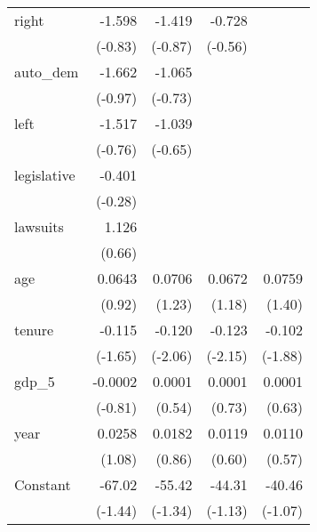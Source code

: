 \begin{table}[h]
{\begin{threeparttable}
\begin{tabular}{l*{4}{D{.}{.}{-1}}}
			\addlinespace
			right               &      -1.598         &      -1.419         &      -0.728         &                     \\
			&     (-0.83)         &     (-0.87)         &     (-0.56)         &                     \\
			\addlinespace
			auto\_dem            &      -1.662         &      -1.065         &                     &                     \\
			&     (-0.97)         &     (-0.73)         &                     &                     \\
			\addlinespace
			left                &      -1.517         &      -1.039         &                     &                     \\
			&     (-0.76)         &     (-0.65)         &                     &                     \\
			\addlinespace
			legislative         &      -0.401         &                     &                     &                     \\
			&     (-0.28)         &                     &                     &                     \\
			\addlinespace
			lawsuits            &       1.126         &                     &                     &                     \\
			&      (0.66)         &                     &                     &                     \\
			\addlinespace
			age                 &      0.0643         &      0.0706         &      0.0672         &      0.0759         \\
			&      (0.92)         &      (1.23)         &      (1.18)         &      (1.40)         \\
			\addlinespace
			tenure              &      -0.115         &      -0.120\sym{**} &      -0.123\sym{**} &      -0.102\sym{*}  \\
			&     (-1.65)         &     (-2.06)         &     (-2.15)         &     (-1.88)         \\
			\addlinespace
			gdp\_5               &   -0.0002         &   0.0001         &   0.0001        &   0.0001         \\
			&     (-0.81)         &      (0.54)         &      (0.73)         &      (0.63)         \\
			\addlinespace
			year                &      0.0258         &      0.0182         &      0.0119         &      0.0110         \\
			&      (1.08)         &      (0.86)         &      (0.60)         &      (0.57)         \\
			\addlinespace
			Constant            &      -67.02         &      -55.42         &      -44.31         &      -40.46         \\
			&     (-1.44)         &     (-1.34)         &     (-1.13)         &     (-1.07)         \\
			

\end{tabular}
\end{threeparttable}}
\end{table}
